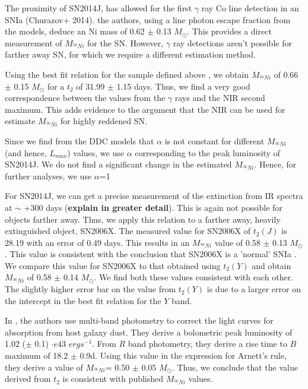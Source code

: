 The proximity of SN2014J, has allowed for the first $\gamma$ ray Co line detection in an SNIa (Churazov+ 2014). the authors, using a line photon escape fraction from the models, 
deduce an Ni mass of 0.62  $\pm$ 0.13 $M_{\odot}$. This provides a direct measurement of  $M_{^{56}Ni}$ for the SN. However, $\gamma$ ray detections aren't possible for farther away SN, for which we require a different estimation method. 

Using the best fit relation for the sample defined above , we obtain $M_{^{56}Ni}$ of 0.66 $\pm$ 0.15 $M_{\odot}$  for a $t_2$ of 31.99 $\pm$ 1.15 days. 
Thus, we find a very good correspondence between the values from the $\gamma$ rays and the NIR second maximum. This adds evidence to the argument that the NIR can be used for estimate $M_{^{56}Ni}$ for highly reddened SN.

Since we find from the DDC models that $\alpha$ is not constant for different $M_{^{56}Ni}$ (and hence, $L_{max}$) values, we use $\alpha$ corresponding to the peak luminosity of SN2014J. We do not find a significant change in the estimated $M_{^{56}Ni}$. Hence, for further analyses, we use $\alpha$=1



For SN2014J, we can get a precise measurement of the extinction from IR spectra at $\sim$ +300 days ({\bf explain in greater detail}). This is again not possible for 
objects farther away. Thus, we apply this relation to a farther away, heavily extinguished object, SN2006X. 
The measured value for SN2006X of $t_2(J)$ is 28.19 with an error of 0.49  days. This results in an $M_{^{56}Ni}$ value of 0.58 $\pm$ 0.13 $M_{\odot}$. This value is consistent with the conclusion that SN2006X is a 'normal' SNIa \citep{Wang2008}. We compare this value for SN2006X to that obtained using $t_2(Y)$ and obtain $M_{^{56}Ni}$ of 0.58 $\pm$ 0.14 $M_{\odot}$. We find both these values consistent with each other. The slightly higher error bar on
 the value from $t_2(Y)$ is due to a larger error on the 
intercept in the best fit relation for the $Y$ band. 


In \citet{Wang2008}, the authors use multi-band photometry to correct the light curves for absorption from host galaxy dust. They derive a bolometric peak luminosity of 1.02 ($\pm$ 0.1) $\cdot e43$ $erg s^{-1}$. From $R$ band photometry, they derive a rise time to $B$ maximum of 18.2 $\pm$ 0.9d. Using this value in the expression for Arnett's rule, they derive a value of $M_{^{56}Ni}$= 0.50 $\pm$ 0.05 $M_{\odot}$. Thus, we conclude that the value derived from $t_2$ is consistent with published  $M_{^{56}Ni}$ values.   


